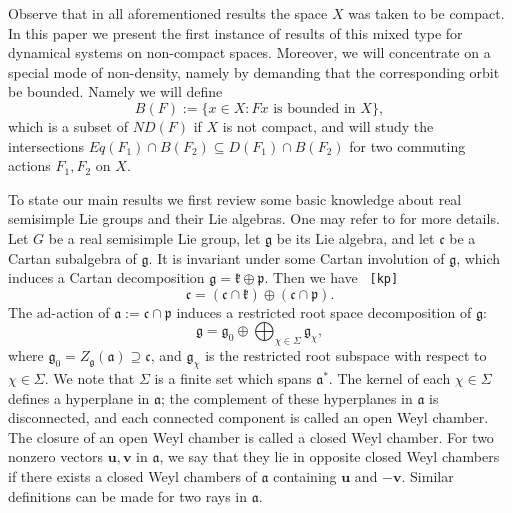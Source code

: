 \documentclass[reqno,12pt]{amsart}
\theoremstyle{definition}
\numberwithin{equation}{section}
\newcommand{\bu}{\mathbf{u}}
\newcommand{\bv}{\mathbf{v}}
\newcommand{\ad}{\mathrm{ad}}
\newcommand {\comm}[1]   {\textcolor{red}{#1}}
\newif\ifdraft\drafttrue
\newcommand\eq[2]{{\ifdraft{\ \tt [#1]}\else\ignorespaces\fi}\begin{equation}\label{eq:#1}{#2}\end{equation}}
\begin{document}
Observe that in all aforementioned results the space $X$ was taken to be compact. 
{In this paper we present the first instance of results of this mixed type for dynamical systems on non-compact spaces. Moreover, we will concentrate on a special mode of non-density, namely by demanding that the corresponding orbit be bounded. Namely we will define $$	B(F):=\{x\in X: Fx \text{ is bounded in }X\},$$
which is a subset of $ND(F)$ if $X$ is not compact,
and will study the intersections $Eq(F_1) \cap B(F_2)\subseteq D(F_1) \cap B(F_2)$
for two commuting actions $F_1,F_2$ on $X$.}

\smallskip


To state our main results we first review some basic knowledge about real semisimple Lie groups and their Lie algebras. {One may refer to \cite{knapp} for more details.} %
Let $G$ be a real semisimple Lie group, let $\mathfrak{g}$ be its Lie algebra, and let $\mathfrak{c}$ be a Cartan subalgebra of $\mathfrak{g}$. It is invariant under some Cartan involution of $\mathfrak{g}$, which %
induces a Cartan decomposition $\mathfrak{g}=\mathfrak{k}\oplus\mathfrak{p}$. Then we have \eq{kp}{
\mathfrak{c}=(\mathfrak{c}\cap\mathfrak{k})\oplus (\mathfrak{c}\cap\mathfrak{p}).
}
The $\ad$-action of $\mathfrak{a}:=\mathfrak{c}\cap\mathfrak{p}$ induces a restricted root space decomposition of $\mathfrak{g}$: $$
\mathfrak{g}=\mathfrak{g}_0\oplus\bigoplus_{\chi\in \Sigma}\mathfrak{g}_\chi,
$$ 
where $\mathfrak{g}_0=Z_{\mathfrak{g}}(\mathfrak{a})\supseteq\mathfrak{c}$, and $\mathfrak{g}_{\chi}$ is the restricted root subspace with respect to $\chi\in\Sigma$. We note that $\Sigma$ is a finite set which spans $\mathfrak{a}^*$. %
The kernel of each $\chi\in\Sigma$ defines a hyperplane in $\mathfrak{a}$; the complement of these hyperplanes in $\mathfrak{a}$ is disconnected, and each connected component is called an open Weyl chamber. The closure of an open Weyl chamber is called a closed Weyl chamber. For two nonzero vectors $\bu,\bv$ in $\mathfrak{a}$, we say that they lie in opposite closed Weyl chambers if there exists a closed Weyl chambers of $\mathfrak{a}$ containing $\bu$ and $-\bv$. Similar definitions can be made for two rays in $\mathfrak{a}$. %
\end{document}
